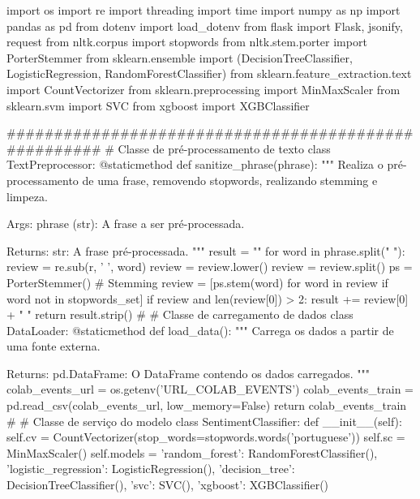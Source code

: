 \begin{codigo}[caption={API para engine de classificação de sentimento baseado em NLP utilizando o Flask como middleware http}, label={codigo:sentiment_api}, language=Python, breaklines=true]
  import os
import re
import threading
import time
import numpy as np
import pandas as pd
from dotenv import load_dotenv
from flask import Flask, jsonify, request
from nltk.corpus import stopwords
from nltk.stem.porter import PorterStemmer
from sklearn.ensemble import (DecisionTreeClassifier, LogisticRegression,
                              RandomForestClassifier)
from sklearn.feature_extraction.text import CountVectorizer
from sklearn.preprocessing import MinMaxScaler
from sklearn.svm import SVC
from xgboost import XGBClassifier


#####################################################
# Classe de pré-processamento de texto
class TextPreprocessor:
    @staticmethod
    def sanitize_phrase(phrase):
        """
        Realiza o pré-processamento de uma frase, removendo stopwords,
        realizando stemming e limpeza.

        Args:
            phrase (str): A frase a ser pré-processada.

        Returns:
            str: A frase pré-processada.
        """
        result = ""
        for word in phrase.split(" "):
            review = re.sub(r, ' ', word)
            review = review.lower()
            review = review.split()
            ps = PorterStemmer()
            # Stemming
            review = [ps.stem(word)
                      for word in review if word not in stopwords_set]
            if review and len(review[0]) > 2:
                result += review[0] + " "
        return result.strip()
#
# Classe de carregamento de dados
class DataLoader:
    @staticmethod
    def load_data():
        """
        Carrega os dados a partir de uma fonte externa.

        Returns:
            pd.DataFrame: O DataFrame contendo os dados carregados.
        """
        colab_events_url = os.getenv('URL_COLAB_EVENTS')
        colab_events_train = pd.read_csv(colab_events_url, low_memory=False)
        return colab_events_train
#
# Classe de serviço do modelo
class SentimentClassifier:
    def __init__(self):
        self.cv = CountVectorizer(stop_words=stopwords.words('portuguese'))
        self.sc = MinMaxScaler()
        self.models = {
            'random_forest': RandomForestClassifier(),
            'logistic_regression': LogisticRegression(),
            'decision_tree': DecisionTreeClassifier(),
            'svc': SVC(),
            'xgboost': XGBClassifier()
        }


\end{codigo}
